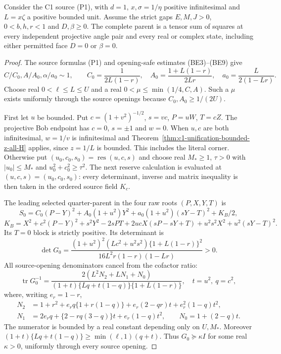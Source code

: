 \begin{theorem}\label{thm:c1-unit-L-all-tests}
Consider the C1 source (P1), with $d=1$, $x,\sigma=1/\eta$ positive
infinitesimal and $L=x\zeta$ a positive bounded unit. Assume the
strict gaps $E,M,J>0$, $0<b,h,r<1$ and $D,\beta\ge0$. The complete parent
is a tensor sum of squares at every independent projective angle pair
and every real or complex state, including either permitted face
$D=0$ or $\beta=0$.
\end{theorem}
\begin{proof}
The source formulas (P1) and opening-safe estimates (BE3)--(BE9) give
\[
 C/C_0,A/A_0,\alpha/a_0\sim1,\qquad
 C_0=\frac1{2L(1-r)},\quad
 A_0=\frac{1+L(1-r)}{2Lr},\quad
 a_0=\frac L{2(1-Lr)}.
\]
Choose real $0<\ell\le L\le U$ and a real
$0<\mu\le\min(1/4,C,A)$. Such a $\mu$ exists uniformly through
the source openings because $C_0,A_0\ge1/(2U)$.

First let $u$ be bounded. Put
$c=(1+v^2)^{-1/2}$, $s=vc$, $P=uW$, $T=cZ$.
The projective Bob endpoint has $c=0$, $s=\pm1$ and $w=0$.
When $u,c$ are both infinitesimal, $w=1/v$ is infinitesimal and
Theorem~\ref{thm:c1-unification-bounded-z-all-H} applies, since
$z=1/L$ is bounded. This includes the literal corner.
Otherwise put $(u_0,c_0,s_0)=\operatorname{res}(u,c,s)$ and choose
real $M_*\ge1$, $\tau>0$ with $|u_0|\le M_*$ and
$u_0^2+c_0^2\ge\tau^2$. The next reserve calculation is evaluated
at $(u,c,s)=(u_0,c_0,s_0)$: every determinant, inverse and matrix
inequality is then taken in the ordered source field $K_c$.

The leading selected quarter-parent in the four raw roots $(P,X,Y,T)$ is
\[
 S_0=C_0(P-Y)^2+A_0(1+u^2)Y^2
                   +a_0(1+u^2)(sY-T)^2+K_B/2,
\]
\[
 K_B=X^2+c^2(P-Y)^2+s^2Y^2-2sPT
 +2ucX(sP-sY+T)+u^2s^2X^2+u^2(sY-T)^2.
\]
Its $T=0$ block is strictly positive. Its determinant is
\[
 \det G_0=\frac{(1+u^2)^2(Lc^2+u^2s^2)
                 \{1+L(1-r)\}^2}{16L^2r(1-r)(1-Lr)}>0.
\]
All source-opening denominators cancel from the cofactor ratio:
\[
 \operatorname{tr}G_0^{-1}
 =\frac{2(L^2N_2+LN_1+N_0)}
 {(1+t)\{Lq+t(1-q)\}\{1+L(1-r)\}},\quad t=u^2,\ q=c^2,
\]
where, writing $e_r=1-r$,
\begin{align*}
 N_2&=1+r^2+e_rq\{1+r(1-q)\}+e_r(2-qr)t+e_r^2(1-q)t^2,\\
 N_1&=2e_rq+\{2-rq(3-q)\}t+e_r(1-q)t^2,\qquad
 N_0=1+(2-q)t.
\end{align*}
The numerator is bounded by a real constant depending only on $U,M_*$.
Moreover $(1+t)\{Lq+t(1-q)\}\ge\min(\ell,1)(q+t)$.
Thus $G_0\succeq\kappa I$ for some real $\kappa>0$, uniformly
through every source opening.


\end{proof}
